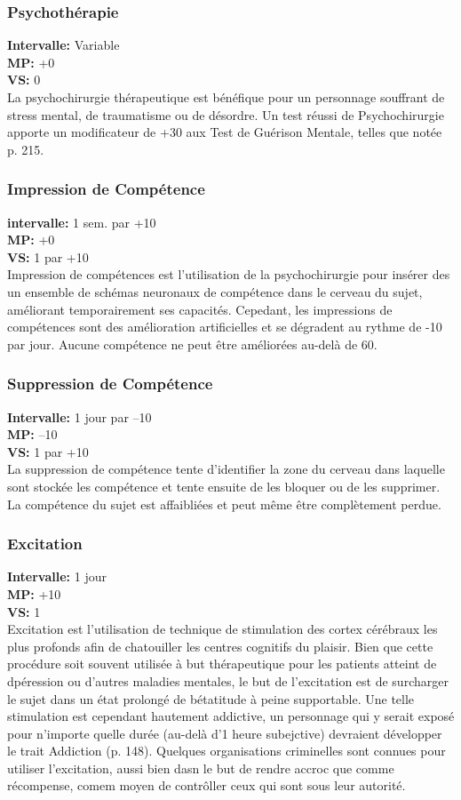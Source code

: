 \subsubsection{Psychothérapie} \textbf{Intervalle:} Variable \\ \textbf{MP:} +0 \\ \textbf{VS:} 0 \\ La psychochirurgie thérapeutique est bénéfique pour un personnage souffrant de stress mental, de traumatisme ou de désordre. Un test réussi de Psychochirurgie apporte un modificateur de +30 aux Test de Guérison Mentale, telles que notée p. 215. 

\subsubsection{Impression de Compétence} \textbf{intervalle:} 1 sem. par +10 \\ \textbf{MP:} +0 \\ \textbf{VS:} 1 par +10\\ Impression de compétences est l'utilisation de la psychochirurgie pour insérer des un ensemble de schémas neuronaux de compétence dans le cerveau du sujet, améliorant temporairement ses capacités. Cepedant, les impressions de compétences sont des amélioration artificielles et se dégradent au rythme de -10 par jour. Aucune compétence ne peut être améliorées au-delà de 60. 

\subsubsection{Suppression de Compétence} \textbf{Intervalle:} 1 jour par –10 \\ \textbf{MP:} –10 \\ \textbf{VS:} 1 par +10\\ La suppression de compétence tente d'identifier la zone du cerveau dans laquelle sont stockée les compétence et tente ensuite de les bloquer ou de les supprimer. La compétence du sujet est affaibliées et peut même être complètement perdue. 

\subsubsection{Excitation} \textbf{Intervalle:} 1 jour \\ \textbf{MP:} +10 \\ \textbf{VS:} 1 \\ Excitation est l'utilisation de technique de stimulation des cortex cérébraux les plus profonds afin de chatouiller les centres cognitifs du plaisir. Bien que cette procédure soit souvent utilisée à but thérapeutique pour les patients atteint de dpéression ou d'autres maladies mentales, le but de l'excitation est de surcharger le sujet dans un état prolongé de bétatitude à peine supportable. Une telle stimulation est cependant hautement addictive, un personnage qui y serait exposé pour n'importe quelle durée (au-delà d'1 heure subejctive) devraient développer le trait Addiction (p. 148). Quelques organisations criminelles sont connues pour utiliser l'excitation, aussi bien dasn le but de rendre accroc que comme récompense, comem moyen de contrôller ceux qui sont sous leur autorité. 

